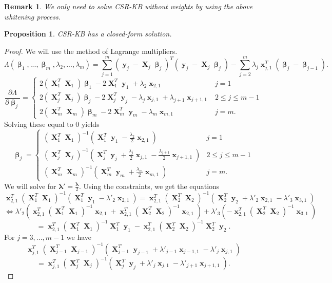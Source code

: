 \documentclass[12pt]{article}
\DeclareMathOperator{\bx}{\mathbf{x}}
\DeclareMathOperator{\bX}{\mathbf{X}}
\DeclareMathOperator{\by}{\mathbf{y}}
\DeclareMathOperator{\bbeta}{\boldsymbol{\beta}}
\newtheorem{prop}{Proposition}
\newtheorem*{remark}{Remark}
\begin{document}
\begin{remark}
We only need to solve CSR-KB without weights by using the above whitening process.
\end{remark}
\begin{prop} \label{prop:main}
CSR-KB has a closed-form solution. 
\end{prop}
\begin{proof}
We will use the method of Lagrange multipliers.
$$\Lambda(\bbeta_1,...,\bbeta_m,\lambda_2,...,\lambda_m) =  \sum_{j=1}^m (\by_j-\bX_j\bbeta_j)^T(\by_j-\bX_j\bbeta_j)-\sum_{j=2}^m\lambda_j\bx_{j, 1}^T (\bbeta_j - \bbeta_{j-1}).$$
$$\frac{\partial \Lambda}{\partial \bbeta_j} = \begin{cases}
2(\bX_1^T  \bX_1)\bbeta_1 - 2\bX_1^T  \by_1 +\lambda_{2}\bx_{2, 1} & j=1 \\
2(\bX_j^T  \bX_j)\bbeta_j - 2\bX_j^T  \by_j - \lambda_j\bx_{j, 1}+\lambda_{j+1}\bx_{j+1, 1} & 2 \leq j \leq m-1 \\
2(\bX_m^T \bX_m)\bbeta_m - 2\bX_m^T \by_m - \lambda_m\bx_{m, 1} & j=m.
\end{cases}$$
Solving these equal to $0$ yields
\begin{equation} \label{eqn:beta}
\bbeta_j=\begin{cases}
(\bX_1^T  \bX_1)^{-1}(\bX_1^T \by_1 -\frac{\lambda_{2}}{2}\bx_{2, 1}) & j=1 \\
(\bX_j^T  \bX_j)^{-1}(\bX_j^T \by_j + \frac{\lambda_j}{2}\bx_{j, 1}-\frac{\lambda_{j+1}}{2}\bx_{j+1, 1}) & 2 \leq j \leq m-1 \\
(\bX_m^T \bX_m)^{-1}(\bX_m^T \by_m + \frac{\lambda_m}{2}\bx_{m, 1}) & j=m.
\end{cases}
\end{equation}
We will solve for $\boldsymbol{\lambda}'=\frac{\boldsymbol{\lambda}}{2}$. Using the constraints, we get the equations
$$\bx_{2,1}^T(\bX_1^T  \bX_1)^{-1}\left(\bX_1^T \by_1 -\lambda'_{2}\bx_{2, 1}\right)=\bx_{2,1}^T(\bX_2^T  \bX_2)^{-1}\left(\bX_2^T\by_2 + \lambda'_{2}\bx_{2, 1}-\lambda'_{3}\bx_{3, 1}\right) $$
$$\iff \lambda'_{2}\left(\bx_{2,1}^T(\bX_1^T \bX_1)^{-1}\bx_{2, 1}+\bx_{2,1}^T(\bX_2^T \bX_2)^{-1}\bx_{2, 1} \right) + \lambda'_3\left(-\bx_{2,1}^T(\bX_2^T \bX_2)^{-1}\bx_{3, 1} \right) $$
$$=\bx_{2,1}^T(\bX_1^T  \bX_1)^{-1}\bX_1^T \by_1-\bx_{2,1}^T(\bX_2^T  \bX_2)^{-1}\bX_2^T \by_2.$$
For $j=3, ..., m-1$ we have
$$\bx_{j,1}^T(\bX_{j-1}^T  \bX_{j-1})^{-1}\left(\bX_{j-1}^T  \by_{j-1} + \lambda'_{j-1}\bx_{j-1, 1}-\lambda'_{j}\bx_{j, 1}\right)$$
$$= \bx_{j,1}^T(\bX_j^T  \bX_j)^{-1}\left( \bX_j^T \by_j + \lambda'_{j}\bx_{j, 1} -\lambda'_{j+1}\bx_{j+1, 1}\right).$$

\end{proof}
\end{document}
